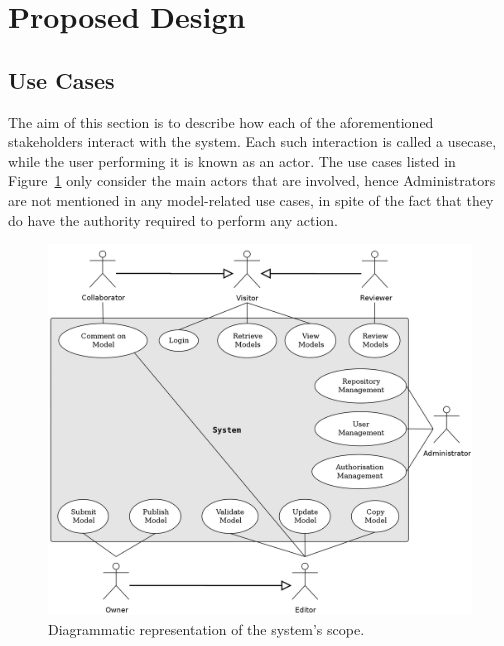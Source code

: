 \section{Proposed Design}
\label{proposedDesign}

\subsection{Use Cases}
\label{useCases}
The aim of this section is to describe how each of the aforementioned stakeholders interact with the system. Each such interaction is called a \gls{usecase}, while the user performing it is known as an \gls{actor}. The use cases listed in Figure~\ref{fig:useCases} only consider the main actors that are involved, hence Administrators are not mentioned in any model-related use cases, in spite of the fact that they do have the authority required to perform any action. 

\begin{figure}[htb]
\centering
\includegraphics{img/UseCases}
\caption{Diagrammatic representation of the system's scope.}
\label{fig:useCases}
\end{figure}

